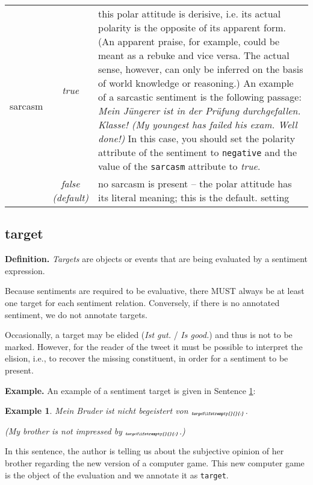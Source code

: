 \documentclass[11pt,a4paper]{article}
\newlength{\clmnwidth}
\theoremstyle{mytheoremstyle}
\newtheorem{exmp}{Example}[section]
\newcommand{\mtag}[2]{{\upshape[\emph{#2}\upshape]$_{\textrm{\bfseries\emph{\tiny
        #1}}}$}}
\newcommand{\target}[2][]{\mtag{tar\-get\ifstrempty{#1}{}{:#1}}{#2}}
\begin{document}
\begin{center}
\begin{table}[ht]
\begin{tabular}{|l|c|p{\clmnwidth}|}
      \multirow{2}{*}{sarcasm} & \textit{true} & this polar attitude is
      derisive, i.e. its actual polarity is the opposite of its apparent
      form. (An apparent praise, for example, could be meant as a rebuke
      and vice versa. The actual sense, however, can only be inferred on
      the basis of world knowledge or reasoning.)  An example of a
      sarcastic sentiment is the following passage: \textit{Mein
        J\"ungerer ist in der Pr\"ufung durchgefallen.  Klasse! (My
        youngest has failed his exam.  Well done!)}  In this case, you
      should set the polarity attribute of the sentiment to
      \texttt{negative} and the value of the \texttt{sarcasm} attribute
      to \textit{true}.\\\cline{2-3}

      & \textit{false\newline(default)} & no sarcasm is present -- the
      polar attitude has its literal meaning; this is the default.
      setting\\\hline
    \end{tabular}
    \label{tbl:sentiment}
  \end{table}
\end{center}

\subsection{target}
\noindent\textbf{Definition.} \emph{Targets} are objects or events
that are being evaluated by a sentiment expression.

\noindent{} Because sentiments are required to be evaluative, there
MUST always be at least one target for each sentiment relation.
Conversely, if there is no annotated sentiment, we do not annotate
targets.

Occasionally, a target may be elided (\emph{Ist gut.} / \emph{Is
  good.})  and thus is not to be marked.  However, for the reader of
the tweet it must be possible to interpret the elision, i.e., to
recover the missing constituent, in order for a sentiment to be
present.

\noindent\textbf{Example.} An example of a sentiment target is given in
Sentence \ref{exmp:target}:
\begin{exmp}
Mein Bruder ist nicht begeistert von \target{dem neuen Call of Duty}.

(My brother is not impressed by \target{the new Call of
  Duty}.)\label{exmp:target}
\end{exmp}
\noindent In this sentence, the author is telling us about the subjective
opinion of her brother regarding the new version of a computer game.  This new
computer game is the object of the evaluation and we annotate it as
\texttt{target}.
\end{document}
